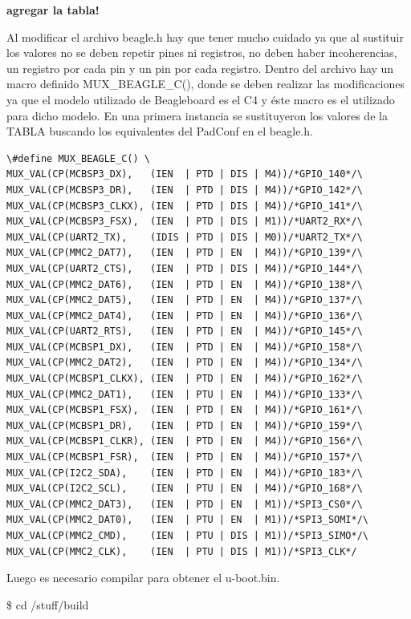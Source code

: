 \bigskip
{\bf{agregar la tabla!}}


\bigskip
Al modificar el archivo beagle.h hay que tener mucho cuidado ya que al sustituir los valores no se deben repetir pines ni registros, no deben haber incoherencias, un registro por cada pin y un pin por cada registro. 
Dentro del archivo hay un macro definido MUX\_BEAGLE\_C(), donde se deben realizar las modificaciones ya que el modelo utilizado de Beagleboard es el C4 y éste macro es el utilizado para dicho modelo.
En una primera instancia se sustituyeron los valores de la TABLA buscando los equivalentes del 
PadConf en el beagle.h. 


\begin{verbatim}
\#define MUX_BEAGLE_C() \
MUX_VAL(CP(MCBSP3_DX),   (IEN  | PTD | DIS | M4))/*GPIO_140*/\
MUX_VAL(CP(MCBSP3_DR),   (IEN  | PTD | DIS | M4))/*GPIO_142*/\
MUX_VAL(CP(MCBSP3_CLKX), (IEN  | PTD | DIS | M4))/*GPIO_141*/\
MUX_VAL(CP(MCBSP3_FSX),  (IEN  | PTD | DIS | M1))/*UART2_RX*/\
MUX_VAL(CP(UART2_TX),    (IDIS | PTD | DIS | M0))/*UART2_TX*/\
MUX_VAL(CP(MMC2_DAT7),   (IEN  | PTD | EN  | M4))/*GPIO_139*/\
MUX_VAL(CP(UART2_CTS),   (IEN  | PTD | DIS | M4))/*GPIO_144*/\
MUX_VAL(CP(MMC2_DAT6),   (IEN  | PTD | EN  | M4))/*GPIO_138*/\
MUX_VAL(CP(MMC2_DAT5),   (IEN  | PTD | EN  | M4))/*GPIO_137*/\
MUX_VAL(CP(MMC2_DAT4),   (IEN  | PTD | EN  | M4))/*GPIO_136*/\
MUX_VAL(CP(UART2_RTS),   (IEN  | PTD | EN  | M4))/*GPIO_145*/\
MUX_VAL(CP(MCBSP1_DX),   (IEN  | PTD | EN  | M4))/*GPIO_158*/\
MUX_VAL(CP(MMC2_DAT2),   (IEN  | PTD | EN  | M4))/*GPIO_134*/\
MUX_VAL(CP(MCBSP1_CLKX), (IEN  | PTD | EN  | M4))/*GPIO_162*/\
MUX_VAL(CP(MMC2_DAT1),   (IEN  | PTU | EN  | M4))/*GPIO_133*/\
MUX_VAL(CP(MCBSP1_FSX),  (IEN  | PTD | EN  | M4))/*GPIO_161*/\
MUX_VAL(CP(MCBSP1_DR),   (IEN  | PTD | EN  | M4))/*GPIO_159*/\
MUX_VAL(CP(MCBSP1_CLKR), (IEN  | PTD | EN  | M4))/*GPIO_156*/\
MUX_VAL(CP(MCBSP1_FSR),  (IEN  | PTD | EN  | M4))/*GPIO_157*/\
MUX_VAL(CP(I2C2_SDA),    (IEN  | PTD | EN  | M4))/*GPIO_183*/\
MUX_VAL(CP(I2C2_SCL),    (IEN  | PTU | EN  | M4))/*GPIO_168*/\
MUX_VAL(CP(MMC2_DAT3),   (IEN  | PTD | EN  | M1))/*SPI3_CS0*/\
MUX_VAL(CP(MMC2_DAT0),   (IEN  | PTU | EN  | M1))/*SPI3_SOMI*/\
MUX_VAL(CP(MMC2_CMD),    (IEN  | PTU | DIS | M1))/*SPI3_SIMO*/\
MUX_VAL(CP(MMC2_CLK),    (IEN  | PTU | DIS | M1))/*SPI3_CLK*/
\end{verbatim}

Luego es necesario compilar para obtener el u-boot.bin.

\bigskip
\centerline{\$ cd /stuff/build}

